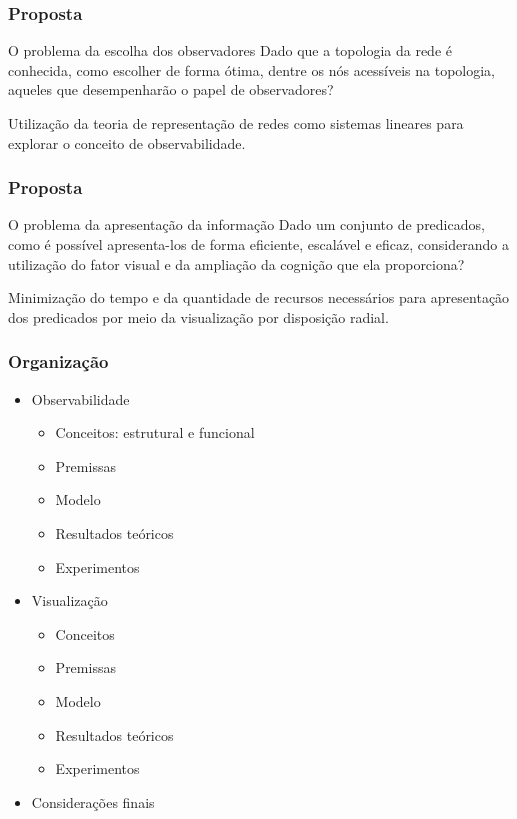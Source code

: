\documentclass[10pt]{beamer}
\begin{document}
\begin{frame}
    \frametitle{Proposta}

\begin{block}{O problema da escolha dos observadores}
Dado que a topologia da rede é conhecida, como escolher de forma ótima,
dentre os nós acessíveis na topologia, aqueles que desempenharão o papel de
observadores?
\end{block}

\vfill

Utilização da teoria de representação de redes como sistemas lineares para
explorar o conceito de observabilidade.

\end{frame}

\begin{frame}
    \frametitle{Proposta}

\begin{block}{O problema da apresentação da informação}
Dado um conjunto de predicados, como é possível apresenta-los de forma
eficiente, escalável e eficaz, considerando a utilização do fator visual e da
ampliação da cognição que ela proporciona?
\end{block}

\vfill

Minimização do tempo e da quantidade de recursos necessários para
apresentação dos predicados por meio da visualização por disposição radial.

\end{frame}

\begin{frame}
    \frametitle{Organização}

\begin{itemize}
\item Observabilidade
    \begin{itemize}
    \item Conceitos: estrutural e funcional
    \item Premissas
    \item Modelo
    \item Resultados teóricos
    \item Experimentos
    \end{itemize}
\item Visualização
    \begin{itemize}
    \item Conceitos
    \item Premissas
    \item Modelo
    \item Resultados teóricos
    \item Experimentos
    \end{itemize}
\item Considerações finais
\end{itemize}

\end{frame}
\end{document}

